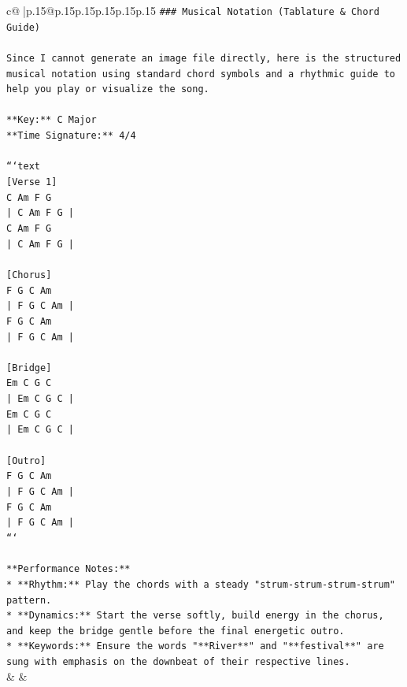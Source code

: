 \documentclass{article}
\begin{document}
{\begin{supertabular}{c@{$\;$}|p{.15\linewidth}@{}p{.15\linewidth}p{.15\linewidth}p{.15\linewidth}p{.15\linewidth}p{.15\linewidth}}
{{{\texttt{\#\#\# Musical Notation (Tablature \& Chord Guide)} \\
\\ 
\texttt{Since I cannot generate an image file directly, here is the structured musical notation using standard chord symbols and a rhythmic guide to help you play or visualize the song.} \\
\\ 
\texttt{**Key:** C Major} \\
\texttt{**Time Signature:** 4/4} \\
\\ 
\texttt{```text} \\
\texttt{{[}Verse 1{]}} \\
\texttt{C  Am  F  G} \\
\texttt{| C  Am  F  G |} \\
\texttt{C  Am  F  G} \\
\texttt{| C  Am  F  G |} \\
\\ 
\texttt{{[}Chorus{]}} \\
\texttt{F  G  C  Am} \\
\texttt{| F  G  C  Am |} \\
\texttt{F  G  C  Am} \\
\texttt{| F  G  C  Am |} \\
\\ 
\texttt{{[}Bridge{]}} \\
\texttt{Em  C  G  C} \\
\texttt{| Em  C  G  C |} \\
\texttt{Em  C  G  C} \\
\texttt{| Em  C  G  C |} \\
\\ 
\texttt{{[}Outro{]}} \\
\texttt{F  G  C  Am} \\
\texttt{| F  G  C  Am |} \\
\texttt{F  G  C  Am} \\
\texttt{| F  G  C  Am |} \\
\texttt{```} \\
\\ 
\texttt{**Performance Notes:**} \\
\texttt{*   **Rhythm:** Play the chords with a steady "strum{-}strum{-}strum{-}strum" pattern.} \\
\texttt{*   **Dynamics:** Start the verse softly, build energy in the chorus, and keep the bridge gentle before the final energetic outro.} \\
\texttt{*   **Keywords:** Ensure the words "**River**" and "**festival**" are sung with emphasis on the downbeat of their respective lines.} \\
            }
        }
    }
    & & \\ \\


\end{supertabular}}
\end{document}
